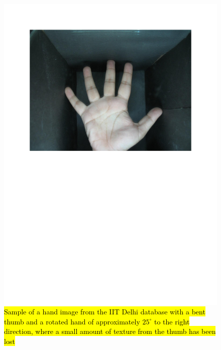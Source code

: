 \documentclass[review]{elsarticle}
\begin{document}
		\begin{figure}[!h]
			\centering
			\includegraphics[page=6,scale=.57,trim=1cm 14.7cm 1cm 1.7cm,clip]{IIT_problematic.pdf}
			\caption{\hl{Sample of a hand image from the IIT Delhi database with a bent thumb and a rotated hand of approximately $25^{\circ}$ to the right direction, where a small amount of texture from the thumb has been lost}}
			\label{fig:IIT_problematic_hand5}
		\end{figure}
\end{document}

